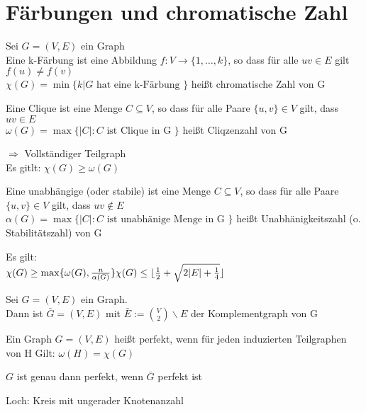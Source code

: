 \documentclass[14pt]{article}
\begin{document}
\section{Färbungen und chromatische Zahl}
\begin{definition}[k-Färbung]
    Sei $G = (V, E)$ ein Graph \\
    Eine k-Färbung ist eine Abbildung $f: V \rightarrow \{1, \dots, k\}$,
    so dass für alle $uv \in E$ gilt $f(u) \neq f(v)$ \\
    $\chi(G) = \min \{k | G \text{ hat eine k-Färbung }\}$ heißt
    chromatische Zahl von G
\end{definition}
\begin{definition} [Clique]
    Eine Clique ist eine Menge $C \subseteq V$, so dass für alle Paare
    $\{u, v\} \in V$ gilt, dass $uv \in E$ \\
    $\omega(G) = \max \{|C|: C \text{ ist Clique in G }\}$ heißt
    Cliqzenzahl von G
\end{definition}
$\Rightarrow$ Vollständiger Teilgraph \\
Es gitlt:  $\chi(G) \geq \omega(G)$
\begin{definition}
    Eine unabhängige (oder stabile) ist eine Menge $C \subseteq V$, so dass für 
    alle Paare$\{u, v\} \in V$ gilt, dass $uv \notin E$ \\
    $\alpha(G) = \max \{|C|: C \text{ ist unabhänige Menge in G }\}$ heißt
    Unabhänigkeitszahl (o. Stabilitätszahl) von G
\end{definition}
Es gilt: \\
$
    \chi(G) \geq \max \{\omega(G), \frac{n}{\alpha(G)}\} \\
    \chi(G) \leq \lfloor \frac{1}{2} + \sqrt{2 |E| + \frac{1}{4}} \rfloor
$
\begin{definition}[Komplementgraph]
    Sei $G = (V, E)$ ein Graph. \\
    Dann ist $\bar{G} = (V, E)$ mit $\bar{E} := \binom{V}{2} \backslash E$
    der Komplementgraph von G
\end{definition}
\begin{definition}
    Ein Graph $G = (V, E)$ heißt perfekt, wenn für jeden induzierten 
    Teilgraphen von H Gilt: $\omega(H) = \chi(G)$
\end{definition}
\begin{eigenschaft}
    $G$ ist genau dann perfekt, wenn $\bar{G}$ perfekt ist
\end{eigenschaft}
Loch: Kreis mit ungerader Knotenanzahl \\
\end{document}
